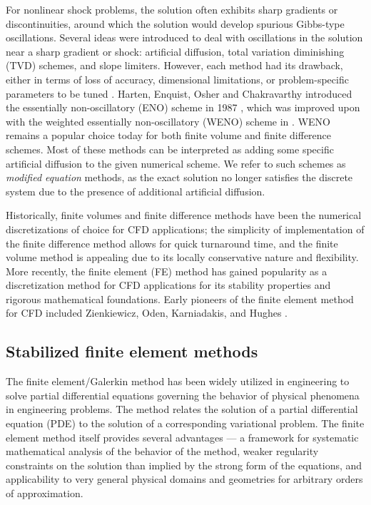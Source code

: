 For nonlinear shock problems, the solution often exhibits sharp gradients or discontinuities, around which the solution would develop spurious Gibbs-type oscillations. Several ideas were introduced to deal with oscillations in the solution near a sharp gradient or shock: artificial diffusion, total variation diminishing (TVD) schemes, and slope limiters. However, each method had its drawback, either in terms of loss of accuracy, dimensional limitations, or problem-specific parameters to be tuned \cite{Shu:Lectures}. Harten, Enquist, Osher and Chakravarthy introduced the essentially non-oscillatory (ENO) scheme in 1987 \cite{ENO}, which was improved upon with the weighted essentially non-oscillatory (WENO) scheme in \cite{WENO}. WENO remains a popular choice today for both finite volume and finite difference schemes. Most of these methods can be interpreted as adding some specific artificial diffusion to the given numerical scheme.  We refer to such schemes as \emph{modified equation} methods, as the exact solution no longer satisfies the discrete system due to the presence of additional artificial diffusion.  

Historically, finite volumes and finite difference methods have been the numerical discretizations of choice for CFD applications; the simplicity of implementation of the finite difference method allows for quick turnaround time, and the finite volume method is appealing due to its locally conservative nature and flexibility. More recently, the finite element (FE) method has gained popularity as a discretization method for CFD applications for its stability properties and rigorous mathematical foundations. Early pioneers of the finite element method for CFD included Zienkiewicz, Oden, Karniadakis, and Hughes \cite{ChungCFDBook}.  

\subsection{Stabilized finite element methods}

The finite element/Galerkin method has been widely utilized in engineering to solve partial differential equations governing the behavior of physical phenomena in engineering problems.  The method relates the solution of a partial differential equation (PDE) to the solution of a corresponding variational problem. The finite element method itself provides several advantages --- a framework for systematic mathematical analysis of the behavior of the method, weaker regularity constraints on the solution than implied by the strong form of the equations, and applicability to very general physical domains and geometries for arbitrary orders of approximation. 

